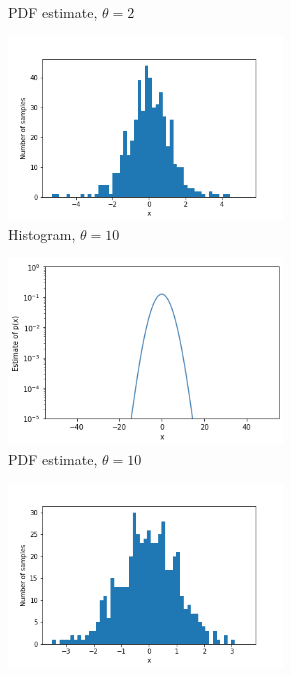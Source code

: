 \documentclass[a4paper]{article}
\begin{document}
\begin{figure}[H]
\begin{subfigure}[b]{0.45\textwidth}
        \caption{PDF estimate, $\theta = 2$}
        \label{fig:gamma_sampled_gaussian_smoothed_2}
    \end{subfigure}
    \begin{subfigure}[b]{0.45\textwidth}
        \centering
        \includegraphics[width=0.8\textwidth]{figures/gamma_sampled_gaussian_histogram_10.png}
        \caption{Histogram, $\theta = 10$}
        \label{fig:gamma_sampled_gaussian_histogram_10}
    \end{subfigure}
    \hfill
    \begin{subfigure}[b]{0.45\textwidth}
        \centering
        \includegraphics[width=0.8\textwidth]{figures/gamma_sampled_gaussian_smoothed_10.png}
        \caption{PDF estimate, $\theta = 10$}
        \label{fig:gamma_sampled_gaussian_smoothed_10}
    \end{subfigure}
    \begin{subfigure}[b]{0.45\textwidth}
        \centering
        \includegraphics[width=0.8\textwidth]{figures/gamma_sampled_gaussian_histogram_100.png}

\end{subfigure}
\end{figure}
\end{document}
